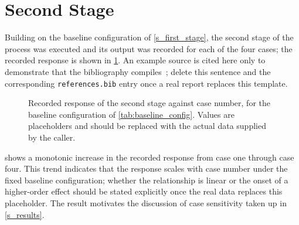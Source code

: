 \section{Second Stage}%
\label{s_second_stage}

Building on the baseline configuration of \cref{s_first_stage}, the
second stage of the process was executed and its output was recorded for
each of the four cases; the recorded response is shown in
\cref{fig:second_stage_response}. An example source is cited here only
to demonstrate that the bibliography compiles~\cite{example_source_2026};
delete this sentence and the corresponding \texttt{references.bib} entry
once a real report replaces this template.

\begin{figure}[!htb]
\centering
{}
\caption{Recorded response of the second stage against case number, for
the baseline configuration of \cref{tab:baseline_config}. Values are
placeholders and should be replaced with the actual data supplied by the
caller.}
\label{fig:second_stage_response}
\end{figure}

 shows a monotonic increase in the
recorded response from case one through case four. This trend indicates
that the response scales with case number under the fixed baseline
configuration; whether the relationship is linear or the onset of a
higher-order effect should be stated explicitly once the real data
replaces this placeholder. The result motivates the discussion of case
sensitivity taken up in \cref{s_results}.
